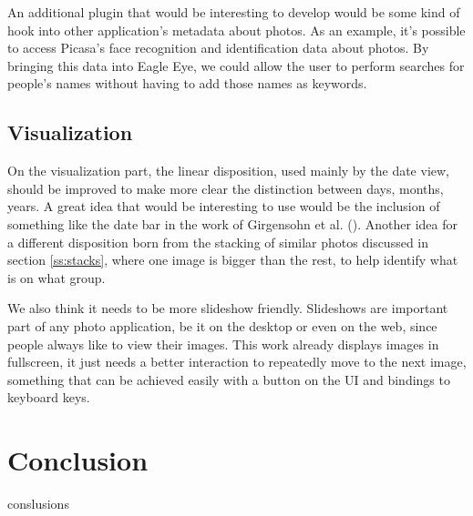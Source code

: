 An additional plugin that would be interesting to develop would be some kind of hook into other application's metadata about photos. As an example, it's possible to access Picasa's face recognition and identification data about photos. By bringing this data into Eagle Eye, we could allow the user to perform searches for people's names without having to add those names as keywords.



\subsection{Visualization} %
\label{sec:visualization}

On the visualization part, the linear disposition, used mainly by the date view, should be improved to make more clear the distinction between days, months, years. A great idea that would be interesting to use would be the inclusion of something like the date bar in the work of Girgensohn et al. \cite{Girgensohn:2010} (). Another idea for a different disposition born from the stacking of similar photos discussed in section \ref{ss:stacks}, where one image is bigger than the rest, to help identify what is on what group.

We also think it needs to be more slideshow friendly. Slideshows are important part of any photo application, be it on the desktop or even on the web, since people always like to view their images. This work already displays images in fullscreen, it just needs a better interaction to repeatedly move to the next image, something that can be achieved easily with a button on the \ac{UI} and bindings to keyboard keys.




\section{Conclusion} %
\label{sec:conclusion}

conslusions



